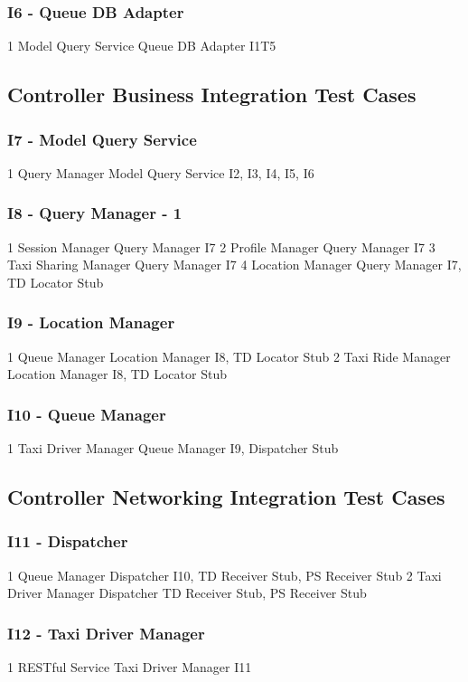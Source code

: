 \subsubsection{I6 - Queue DB Adapter}
\testCaseSimpleSimple
	{1}
	{Model Query Service}
	{Queue DB Adapter}
	{I1T5}
\subsection{Controller Business Integration Test Cases}
\subsubsection{I7 - Model Query Service}
\testCaseSimpleSimple
	{1}
	{Query Manager}
	{Model Query Service}
	{I2, I3, I4, I5, I6}
\subsubsection{I8 - Query Manager - 1}
\testCaseSimpleSimple
	{1}
	{Session Manager}
	{Query Manager}
	{I7}
\testCaseSimpleSimple
	{2}
	{Profile Manager}
	{Query Manager}
	{I7}
\testCaseSimpleSimple
	{3}
	{Taxi Sharing Manager}
	{Query Manager}
	{I7}
\testCaseSimpleSimple
	{4}
	{Location Manager}
	{Query Manager}
	{I7, TD Locator Stub}
\subsubsection{I9 - Location Manager}
\testCaseSimpleSimple
	{1}
	{Queue Manager}
	{Location Manager}
	{I8, TD Locator Stub}
\testCaseSimpleSimple
	{2}
	{Taxi Ride Manager}
	{Location Manager}
	{I8, TD Locator Stub}
\subsubsection{I10 - Queue Manager}
\testCaseSimpleSimple
	{1}
	{Taxi Driver Manager}
	{Queue Manager}
	{I9, Dispatcher Stub}

\subsection{Controller Networking Integration Test Cases}
\subsubsection{I11 - Dispatcher}
\testCaseSimpleSimple
	{1}
	{Queue Manager}
	{Dispatcher}
	{I10, TD Receiver Stub, PS Receiver Stub}
\testCaseSimpleSimple
	{2}
	{Taxi Driver Manager}
	{Dispatcher}
	{TD Receiver Stub, PS Receiver Stub}
\subsubsection{I12 - Taxi Driver Manager}
\testCaseSimpleSimple
	{1}
	{RESTful Service}
	{Taxi Driver Manager}
	{I11}
